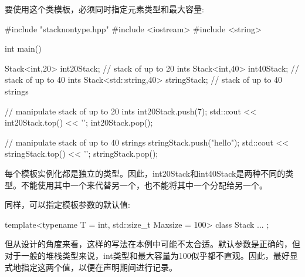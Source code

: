 要使用这个类模板，必须同时指定元素类型和最大容量:

\begin{cpp}
#include "stacknontype.hpp"
#include <iostream>
#include <string>

int main()
{
	Stack<int,20> int20Stack; // stack of up to 20 ints
	Stack<int,40> int40Stack; // stack of up to 40 ints
	Stack<std::string,40> stringStack; // stack of up to 40 strings
	
	// manipulate stack of up to 20 ints
	int20Stack.push(7);
	std::cout << int20Stack.top() << '\n';
	int20Stack.pop();
	
	// manipulate stack of up to 40 strings
	stringStack.push("hello");
	std::cout << stringStack.top() << '\n';
	stringStack.pop();
}
\end{cpp}

每个模板实例化都是独立的类型。因此，int20Stack和int40Stack是两种不同的类型。不能使用其中一个来代替另一个，也不能将其中一个分配给另一个。

同样，可以指定模板参数的默认值:

\begin{cpp}
template<typename T = int, std::size_t Maxsize = 100>
class Stack {
	...
};
\end{cpp}

但从设计的角度来看，这样的写法在本例中可能不太合适。默认参数是正确的，但对于一般的堆栈类型来说，int类型和最大容量为100似乎都不直观。因此，最好显式地指定这两个值，以便在声明期间进行记录。





























